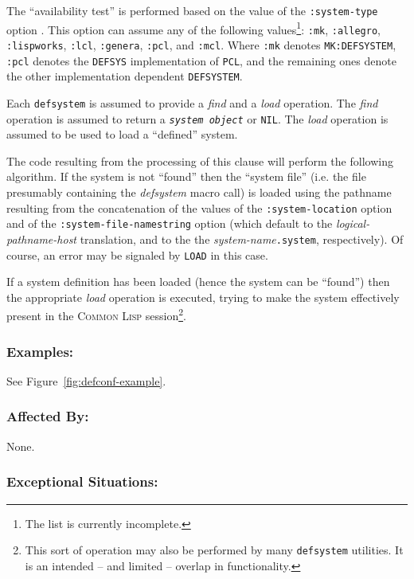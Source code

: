 \documentclass[a4paper]{article}
\newcommand{\CL}{\textsc{Common Lisp}}
\newcommand{\notimpl}{\ddag}
\newcommand{\code}[1]{\texttt{#1}}
\newcommand{\clobject}[1]{\texttt{\textit{#1}}} %
\begin{document}
\begin{description}
	The ``availability test'' is performed based on the value of
	the \code{:system-type} option \notimpl{}.  This option can
	assume any of the following values\footnote{The list is
	currently incomplete.}: \code{:mk}, \code{:allegro}, \code{:lispworks},
	\code{:lcl}, \code{:genera}, \code{:pcl}, and \code{:mcl}.
	Where \code{:mk} denotes \code{MK:DEFSYSTEM}, \code{:pcl}
	denotes the \code{DEFSYS} implementation of \code{PCL}, and
	the remaining ones denote the other implementation dependent
	\code{DEFSYSTEM}.

	Each \code{defsystem} is assumed to provide a \emph{find} and
	a \emph{load} operation.  The \emph{find} operation is assumed
	to return a \clobject{system object} or \code{NIL}.
	The \emph{load} operation is assumed to be used to load a
	``defined'' system.

	The code resulting from the processing of this clause will
	perform the following algorithm.  If the system is not
	``found'' then the ``system file'' (i.e. the file presumably
	containing the \emph{defsystem} macro call) is loaded using
	the pathname resulting from the concatenation of the values of
	the \code{:system-location} option and of the
	\code{:system-file-namestring} option (which default to the
	\emph{logical-pathname-host} translation, and to the the
	\emph{system-name}\code{.system}, respectively). Of course, an
	error may be signaled by \code{LOAD} in this case.

	If a system definition has been loaded (hence the system can be
	``found'') then the appropriate \emph{load} operation is
	executed, trying to make the system effectively present in the
	\CL{} session\footnote{This sort of operation may also be
	performed by many \code{defsystem} utilities.  It is an
	intended -- and limited -- overlap in functionality.}.
\end{description}

\subsubsection*{Examples:}

See Figure~\ref{fig:defconf-example}.

\subsubsection*{Affected By:}

None.

\subsubsection*{Exceptional Situations:}
\end{document}
